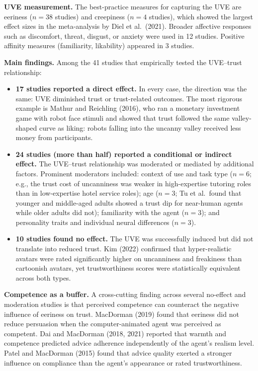 \documentclass[11pt, a4paper]{article}
\begin{document}
\textbf{UVE measurement.} The best-practice measures for capturing the UVE are eeriness ($n = 38$ studies) and creepiness ($n = 4$ studies), which showed the largest effect sizes in the meta-analysis by Diel et al.\ (2021). Broader affective responses such as discomfort, threat, disgust, or anxiety were used in 12 studies. Positive affinity measures (familiarity, likability) appeared in 3 studies.

\textbf{Main findings.} Among the 41 studies that empirically tested the UVE--trust relationship:

\begin{itemize}[leftmargin=2em]
  \item \textbf{17 studies reported a direct effect.} In every case, the direction was the same: UVE diminished trust or trust-related outcomes. The most rigorous example is Mathur and Reichling (2016), who ran a monetary investment game with robot face stimuli and showed that trust followed the same valley-shaped curve as liking: robots falling into the uncanny valley received less money from participants.
  \item \textbf{24 studies (more than half) reported a conditional or indirect effect.} The UVE--trust relationship was moderated or mediated by additional factors. Prominent moderators included: context of use and task type ($n = 6$; e.g., the trust cost of uncanniness was weaker in high-expertise tutoring roles than in low-expertise hotel service roles); age ($n = 3$; Tu et al.\ found that younger and middle-aged adults showed a trust dip for near-human agents while older adults did not); familiarity with the agent ($n = 3$); and personality traits and individual neural differences ($n = 3$).
  \item \textbf{10 studies found no effect.} The UVE was successfully induced but did not translate into reduced trust. Kim (2022) confirmed that hyper-realistic avatars were rated significantly higher on uncanniness and freakiness than cartoonish avatars, yet trustworthiness scores were statistically equivalent across both types.
\end{itemize}

\textbf{Competence as a buffer.} A cross-cutting finding across several no-effect and moderation studies is that perceived competence can counteract the negative influence of eeriness on trust. MacDorman (2019) found that eeriness did not reduce persuasion when the computer-animated agent was perceived as competent. Dai and MacDorman (2018, 2021) reported that warmth and competence predicted advice adherence independently of the agent's realism level. Patel and MacDorman (2015) found that advice quality exerted a stronger influence on compliance than the agent's appearance or rated trustworthiness.
\end{document}
